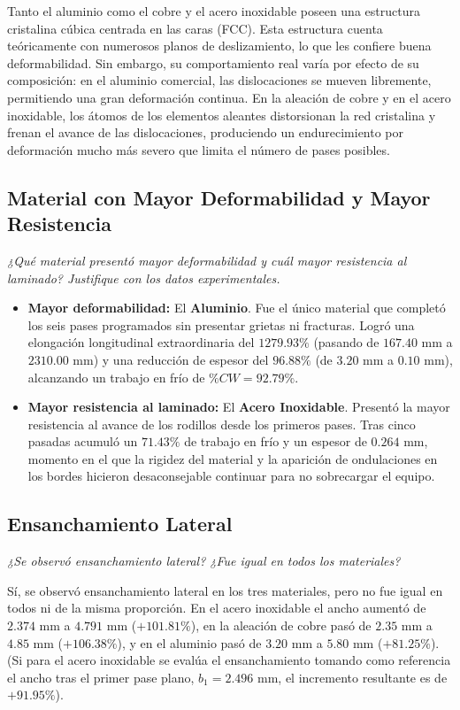 \documentclass[journal]{IEEEtran}
\begin{document}
Tanto el aluminio como el cobre y el acero inoxidable poseen una estructura cristalina cúbica centrada en las caras (FCC). Esta estructura cuenta teóricamente con numerosos planos de deslizamiento, lo que les confiere buena deformabilidad. Sin embargo, su comportamiento real varía por efecto de su composición: en el aluminio comercial, las dislocaciones se mueven libremente, permitiendo una gran deformación continua. En la aleación de cobre y en el acero inoxidable, los átomos de los elementos aleantes distorsionan la red cristalina y frenan el avance de las dislocaciones, produciendo un endurecimiento por deformación mucho más severo que limita el número de pases posibles.

\subsection{Material con Mayor Deformabilidad y Mayor Resistencia}
\textit{¿Qué material presentó mayor deformabilidad y cuál mayor resistencia al laminado? Justifique con los datos experimentales.}
\begin{itemize}
    \item \textbf{Mayor deformabilidad:} El \textbf{Aluminio}. Fue el único material que completó los seis pases programados sin presentar grietas ni fracturas. Logró una elongación longitudinal extraordinaria del $1279.93\%$ (pasando de $167.40\text{ mm}$ a $2310.00\text{ mm}$) y una reducción de espesor del $96.88\%$ (de $3.20\text{ mm}$ a $0.10\text{ mm}$), alcanzando un trabajo en frío de $\%CW = 92.79\%$.
    \item \textbf{Mayor resistencia al laminado:} El \textbf{Acero Inoxidable}. Presentó la mayor resistencia al avance de los rodillos desde los primeros pases. Tras cinco pasadas acumuló un $71.43\%$ de trabajo en frío y un espesor de $0.264\text{ mm}$, momento en el que la rigidez del material y la aparición de ondulaciones en los bordes hicieron desaconsejable continuar para no sobrecargar el equipo.
\end{itemize}

\subsection{Ensanchamiento Lateral}
\textit{¿Se observó ensanchamiento lateral? ¿Fue igual en todos los materiales?}

Sí, se observó ensanchamiento lateral en los tres materiales, pero no fue igual en todos ni de la misma proporción. En el acero inoxidable el ancho aumentó de $2.374\text{ mm}$ a $4.791\text{ mm}$ ($+101.81\%$), en la aleación de cobre pasó de $2.35\text{ mm}$ a $4.85\text{ mm}$ ($+106.38\%$), y en el aluminio pasó de $3.20\text{ mm}$ a $5.80\text{ mm}$ ($+81.25\%$). (Si para el acero inoxidable se evalúa el ensanchamiento tomando como referencia el ancho tras el primer pase plano, $b_1 = 2.496\text{ mm}$, el incremento resultante es de $+91.95\%$).
\end{document}

